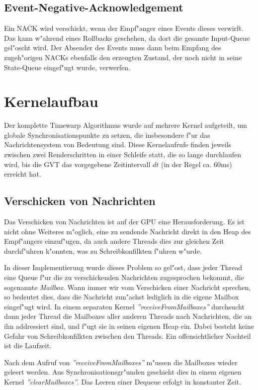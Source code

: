 \documentclass[a4paper, 10pt, openright, parskip, chapterprefix]{scrreprt}
\begin{document}
\subsection{Event-Negative-Acknowledgement}
Ein NACK wird verschickt, wenn der Empf"anger eines Events dieses verwirft. Das kann w"ahrend eines Rollbacks geschehen,
da dort die gesamte Input-Queue gel"oscht wird. Der Absender des Events muss dann beim Empfang des zugeh"origen NACKs
ebenfalls den erzeugten Zustand, der noch nicht in seine State-Queue eingef"ugt wurde, verwerfen.

\section{Kernelaufbau}
\label{sec:Kernelaufbau}
Der komplette Timewarp Algorithmus wurde auf mehrere Kernel aufgeteilt, um globale Synchronisationspunkte zu setzen, die
insbesondere f"ur das Nachrichtensystem von Bedeutung sind. 
Diese Kernelaufrufe finden jeweils zwischen zwei Renderschritten in einer Schleife statt, die so lange durchlaufen wird,
bis die GVT das vorgegebene Zeitintervall $dt$ (in der Regel ca. 60ms) erreicht hat.

\subsection{Verschicken von Nachrichten}
\label{subsec:VerschickenVonNachrichten}
Das Verschicken von Nachrichten ist auf der GPU eine Herausforderung. Es ist nicht ohne Weiteres m"oglich, eine zu sendende
Nachricht direkt in den Heap des Empf"angers einzuf"ugen, da auch andere Threads dies zur gleichen Zeit durchf"uhren
k"onnten, was zu Schreibkonfilkten f"uhren w"urde.

In dieser Implementierung wurde dieses Problem so gel"ost, dass jeder Thread eine Queue f"ur die zu verschickenden
Nachrichten zugesprochen bekommt, die sogenannte \emph{Mailbox}. Wann immer wir vom Verschicken einer Nachricht
sprechen, so bedeutet dies, dass die Nachricht zun"achst lediglich in die eigene Mailbox eingef"ugt wird.
In einem separaten
Kernel \emph{''receiveFromMailboxes''} durchsucht dann jeder Thread die Mailboxes aller anderen Threads nach
Nachrichten, die an ihn addressiert sind,
und f"ugt sie in seinen eigenen Heap ein. Dabei besteht keine Gefahr von Schreibkonfilkten zwischen den Threads.
Ein offensichtlicher Nachteil ist die Laufzeit.

Nach dem Aufruf von \emph{''receiveFromMailboxes''} m"ussen die Mailboxes wieder geleert werden. Aus
Synchronisationsgr"unden geschieht dies in einem eigenen Kernel \emph{''clearMailboxes''}. Das Leeren einer Dequeue
erfolgt in konstanter Zeit.
\end{document}
